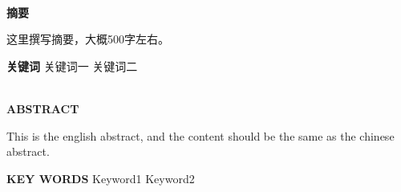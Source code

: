 \documentclass[../main.tex]{subfiles}
\begin{document}
\begin{titlepage}

    \pagestyle{empty}

    \begin{spacing}{1.05}
        \centering
        \parbox[c]{.75\textwidth}{
          \centering
          \heiti{}\textbf{\thesistitle}
        }
    \end{spacing}

    \begin{spacing}{1.5}
        \centering
        \quad{} \\ 
        \heiti{}\textbf{摘\quad{}要} \\ 
    \end{spacing}
    \quad{}

    \normalsize

    这里撰写摘要，大概500字左右。

    \quad{}

    \par\noindent\heiti{}\textbf{关键词}\quad{}
    {
      \songti{}
      关键词一\quad
      关键词二\quad
    } 
\end{titlepage}

\thispagestyle{empty}

\begin{titlepage}

    \pagestyle{empty}

    \begin{spacing}{1.05}
        \centering
        \parbox[c]{.75\textwidth}{
          \centering
          \textbf{\thesisenglishtitle}
        }
    \end{spacing}

    \begin{spacing}{1.5}
        \centering
        \quad \\ 
        \textbf{ABSTRACT} \\ 
    \end{spacing}
    \quad

    \normalsize

    This is the english abstract, and the content should be the same as the chinese abstract.

    \quad{}

    \par\noindent{}\textbf{KEY WORDS}\quad{}%
    {
      Keyword1\quad
      Keyword2\quad
    }

\end{titlepage}

\thispagestyle{empty}
\end{document}
